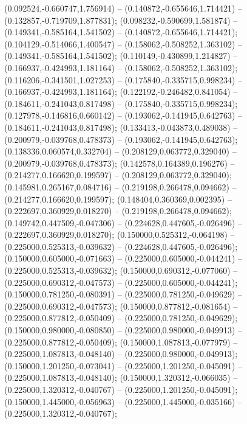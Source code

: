  (0.092524,-0.660747,1.756914) -- (0.140872,-0.655646,1.714421) -- (0.132857,-0.719709,1.877831);
 (0.098232,-0.590699,1.581874) -- (0.149341,-0.585164,1.541502) -- (0.140872,-0.655646,1.714421);
 (0.104129,-0.514066,1.400547) -- (0.158062,-0.508252,1.363102) -- (0.149341,-0.585164,1.541502);
 (0.110149,-0.430899,1.214827) -- (0.166937,-0.424993,1.181164) -- (0.158062,-0.508252,1.363102);
 (0.116206,-0.341501,1.027253) -- (0.175840,-0.335715,0.998234) -- (0.166937,-0.424993,1.181164);
 (0.122192,-0.246482,0.841054) -- (0.184611,-0.241043,0.817498) -- (0.175840,-0.335715,0.998234);
 (0.127978,-0.146816,0.660142) -- (0.193062,-0.141945,0.642763) -- (0.184611,-0.241043,0.817498);
 (0.133413,-0.043873,0.489038) -- (0.200979,-0.039768,0.478373) -- (0.193062,-0.141945,0.642763);
 (0.138336,0.060574,0.332704) -- (0.208129,0.063772,0.329040) -- (0.200979,-0.039768,0.478373);
 (0.142578,0.164389,0.196276) -- (0.214277,0.166620,0.199597) -- (0.208129,0.063772,0.329040);
 (0.145981,0.265167,0.084716) -- (0.219198,0.266478,0.094662) -- (0.214277,0.166620,0.199597);
 (0.148404,0.360369,0.002395) -- (0.222697,0.360929,0.018270) -- (0.219198,0.266478,0.094662);
 (0.149742,0.447509,-0.047306) -- (0.224628,0.447605,-0.026496) -- (0.222697,0.360929,0.018270);
 (0.150000,0.525312,-0.064198) -- (0.225000,0.525313,-0.039632) -- (0.224628,0.447605,-0.026496);
 (0.150000,0.605000,-0.071663) -- (0.225000,0.605000,-0.044241) -- (0.225000,0.525313,-0.039632);
 (0.150000,0.690312,-0.077060) -- (0.225000,0.690312,-0.047573) -- (0.225000,0.605000,-0.044241);
 (0.150000,0.781250,-0.080391) -- (0.225000,0.781250,-0.049629) -- (0.225000,0.690312,-0.047573);
 (0.150000,0.877812,-0.081654) -- (0.225000,0.877812,-0.050409) -- (0.225000,0.781250,-0.049629);
 (0.150000,0.980000,-0.080850) -- (0.225000,0.980000,-0.049913) -- (0.225000,0.877812,-0.050409);
 (0.150000,1.087813,-0.077979) -- (0.225000,1.087813,-0.048140) -- (0.225000,0.980000,-0.049913);
 (0.150000,1.201250,-0.073041) -- (0.225000,1.201250,-0.045091) -- (0.225000,1.087813,-0.048140);
 (0.150000,1.320312,-0.066035) -- (0.225000,1.320312,-0.040767) -- (0.225000,1.201250,-0.045091);
 (0.150000,1.445000,-0.056963) -- (0.225000,1.445000,-0.035166) -- (0.225000,1.320312,-0.040767);
